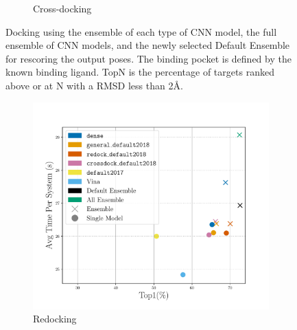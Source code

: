 \documentclass[journal=jcisd8,manuscript=article]{achemso}
\begin{document}
\begin{figure}
\begin{subfigure}[b]{0.48\textwidth}
		\caption{Cross-docking}
		\label{fig:RescoreEnsembleCrossdock}
        \end{subfigure}    
	\caption{Docking using the ensemble of each type of CNN model, the full ensemble of CNN models, and the newly selected Default Ensemble for rescoring the output poses. The binding pocket is defined by the known binding ligand. TopN is the percentage of targets ranked above or at N with a RMSD less than 2{\AA}.}
	\label{fig:RescoreEnsemble}
\end{figure}    


\begin{figure}    
        \begin{subfigure}[b]{0.48\textwidth}
                \centering
                \includegraphics[width=\textwidth]{figures/redocking/gpu_models_line_rescore.pdf}
                \caption{Redocking}
                \label{fig:OptimalRescRD}
        \end{subfigure}    
        \begin{subfigure}[b]{0.48\textwidth}
                \centering

\end{subfigure}
\end{figure}
\end{document}
